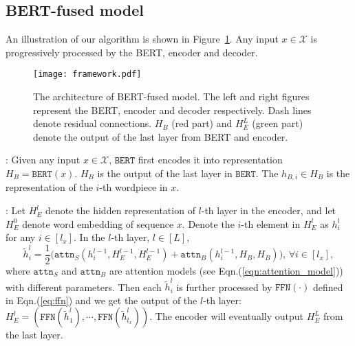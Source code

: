 \documentclass{article} \usepackage{iclr2020_conference,times}
\newcommand{\domX}{\mathcal{X}}
\newcommand{\bert}{\texttt{BERT}}
\newcommand{\attn}{\texttt{attn}}
\newcommand{\ffn}{\texttt{FFN}}
\newcommand{\myeqref}[1]{Eqn.(\ref{#1})}
\begin{document}
\subsection{BERT-fused model}
An illustration of our algorithm is shown in Figure~\ref{fig:framework}. Any input $x\in\domX$ is progressively processed by the BERT, encoder and decoder.

\begin{figure}[!htbp]
\centering
\texttt{[image: framework.pdf]}
\caption{The architecture of BERT-fused model. The left and right figures represent the BERT, encoder and decoder respectively. Dash lines denote residual connections. $H_B$ (red part) and $H^L_E$ (green part) denote the output of the last layer from BERT and encoder.}
\label{fig:framework}
\end{figure}

: Given any input $x\in\domX$, $\bert$ first encodes it into representation $H_B=\bert(x)$. $H_B$ is the output of the last layer in $\bert$. The $h_{B,i}\in H_B$ is the representation of the $i$-th wordpiece in $x$. 

: Let $H^l_E$ denote the hidden representation of $l$-th layer in the encoder, and let $H^0_E$ denote word embedding of sequence $x$. Denote the $i$-th element in $H^l_E$ as $h^l_i$ for any $i\in[l_x]$. In the $l$-th layer, $l\in[L]$,
\begin{equation}
\tilde{h}^l_i=\frac{1}{2}\big(\attn_S(h^{l-1}_i,H^{l-1}_E,H^{l-1}_E) + \attn_B(h^{l-1}_i,H_B,H_B)\big),\,\forall i\in[l_x],
\label{eq:encoder_module}
\end{equation}
where $\attn_S$ and $\attn_B$ are attention models (see Eqn.(\ref{eqn:attention_model})) with different parameters. Then each $\tilde{h}^l_i$ is further processed by $\ffn(\cdot)$ defined in \myeqref{eq:ffn} and we get the output of the $l$-th layer: $H^l_E=(\ffn(\tilde{h}^l_1),\cdots,\ffn(\tilde{h}^l_{l_x}))$. The encoder will eventually output $H^L_E$ from the last layer.
\end{document}
